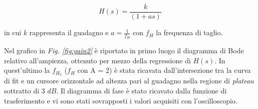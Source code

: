 \documentclass[journal]{IEEEtran}
\begin{document}
\begin{equation}
    H(s)=\frac{k}{(1+as)}
\end{equation}

in cui $k$ rappresenta il guadagno e $a = \frac{1}{f_H}$ con $f_H$ la frequenza di taglio. 

Nel grafico in \textit{Fig. \ref{fig:gain2}} è riportato in primo luogo il diagramma di Bode relativo all'ampiezza, ottenuto per mezzo della regressione di $H(s)$. In quest'ultimo la $f_{H_2}$ ($f_{H}$ con A = 2) è stata ricavata dall'intersezione tra la curva di fit e un cursore orizzontale ad altezza pari al guadagno nella regione di \textit{plateau} sottratto di $3$ $dB$. Il diagramma di fase è stato ricavato dalla funzione di trasferimento e vi sono stati sovrapposti i valori acquisiti con l'oscilloscopio. 
\end{document}
